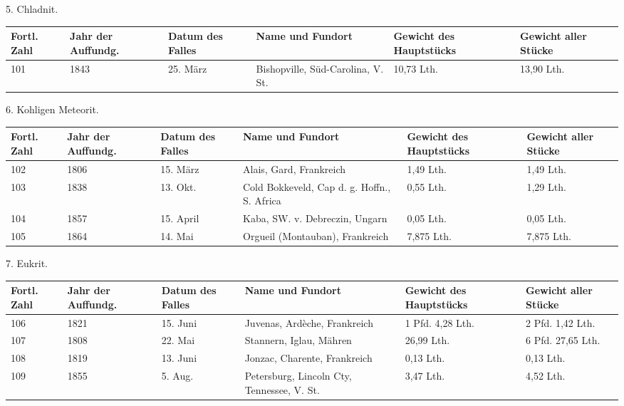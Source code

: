 \documentclass[a4paper, 11pt, oneside]{article}
\begin{document}
\clearpage
\begin{center}
5. Chladnit.
\end{center}
\begin{center}
\begin{footnotesize}
\begin{tabular}{ |p{7mm}|p{7mm}|p{13mm}|p{48mm}|p{22mm}|p{22mm}| }
    \hline
    Fortl. Zahl & Jahr der Auffundg. & Datum des Falles & Name und Fundort & Gewicht des Hauptstücks & Gewicht aller Stücke\\
    \hline\hline
    101 & 1843 & 25. März & Bishopville, Süd-Carolina, V. St. & 10,73 Lth. & 13,90 Lth.\\
    \hline
\end{tabular}
\end{footnotesize}
\end{center}
\begin{center}
6. Kohligen Meteorit.
\end{center}
\begin{center}
\begin{footnotesize}
\begin{tabular}{ |p{7mm}|p{7mm}|p{13mm}|p{48mm}|p{22mm}|p{22mm}| }
    \hline
    Fortl. Zahl & Jahr der Auffundg. & Datum des Falles & Name und Fundort & Gewicht des Hauptstücks & Gewicht aller Stücke\\
    \hline\hline
    102 & 1806 & 15. März & Alais, Gard, Frankreich & 1,49 Lth. & 1,49 Lth.\\\hline
    103 & 1838 & 13. Okt. & Cold Bokkeveld, Cap d. g. Hoffn., S. Africa & 0,55 Lth. & 1,29 Lth.\\\hline
    104 & 1857 & 15. April & Kaba, SW. v. Debreczin, Ungarn & 0,05 Lth. & 0,05 Lth.\\\hline
    105 & 1864 & 14. Mai & Orgueil (Montauban), Frankreich & 7,875 Lth. & 7,875 Lth.\\
    \hline
\end{tabular}
\end{footnotesize}
\end{center}
\begin{center}
7. Eukrit.
\end{center}
\begin{center}
\begin{footnotesize}
\begin{tabular}{ |p{7mm}|p{7mm}|p{13mm}|p{48mm}|p{22mm}|p{22mm}| }
    \hline
    Fortl. Zahl & Jahr der Auffundg. & Datum des Falles & Name und Fundort & Gewicht des Hauptstücks & Gewicht aller Stücke\\
    \hline\hline
    106 & 1821 & 15. Juni & Juvenas, Ardèche, Frankreich & 1 Pfd. 4,28 Lth. & 2 Pfd. 1,42 Lth.\\\hline
    107 & 1808 & 22. Mai & Stannern, Iglau, Mähren & 26,99 Lth. & 6 Pfd. 27,65 Lth.\\\hline
    108 & 1819 & 13. Juni & Jonzac, Charente, Frankreich & 0,13 Lth. & 0,13 Lth.\\\hline
    109 & 1855 & 5. Aug. & Petersburg, Lincoln Cty, Tennessee, V. St. & 3,47 Lth. & 4,52 Lth.\\
    \hline
\end{tabular}
\end{footnotesize}
\end{center}
\end{document}
